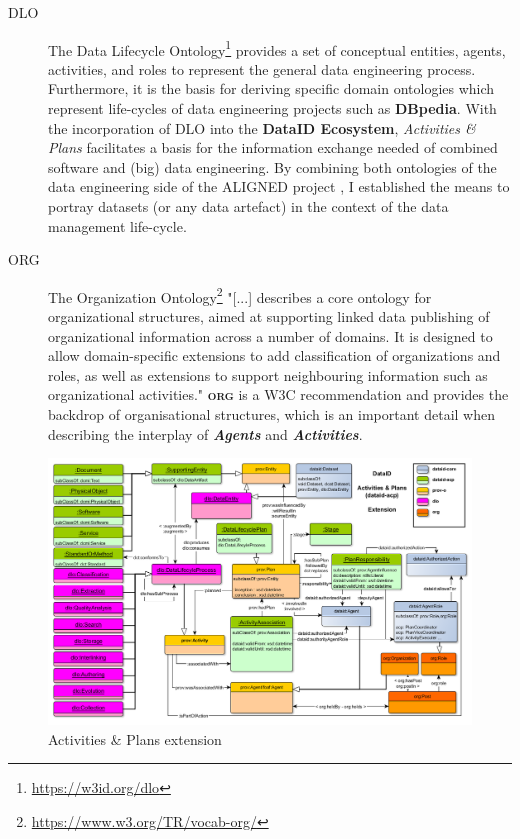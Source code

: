 \documentclass[a4paper,english,twoside,BCOR1.5cm,headsepline,DIV12,appendixprefix,final,12pt]{scrbook}
\newcommand{\ecosystem}{{\ttfamily\bfseries DataID Ecosystem}\xspace}
\newcommand{\org}{{\scshape\bfseries org}\xspace}
\newcommand{\dbpedia}{{\ttfamily\bfseries DBpedia}\xspace}
\newcommand{\important}[1]{\textbf{\textit{#1}}}
\newcommand\footnoteurl[1]{\footnote{\scriptsize\url{#1}}}
\begin{document}
\begin{description}
\item[DLO] The Data Lifecycle Ontology\footnoteurl{https://w3id.org/dlo} provides a set of conceptual entities, agents, activities, and roles to represent the general data engineering process. Furthermore, it is the basis
for deriving specific domain ontologies which represent life-cycles of
data engineering projects such as \dbpedia. With the incorporation of DLO into the \ecosystem, \textit{Activities \& Plans} facilitates a basis for the information exchange needed of combined software and (big) data engineering. By combining both ontologies of the data engineering side of the ALIGNED project \cite{SolankiBFKDB16}, I established the means to portray datasets (or any data artefact) in the context of the data management life-cycle. 
\item[ORG] The Organization Ontology\footnoteurl{https://www.w3.org/TR/vocab-org/} "[...] describes a core ontology for organizational structures, aimed at supporting linked data publishing of organizational information across a number of domains. It is designed to allow domain-specific extensions to add classification of organizations and roles, as well as extensions to support neighbouring information such as organizational activities." \cite{ReynoldsOrg} \org is a W3C recommendation and provides the backdrop of organisational structures, which is an important detail when describing the interplay of \important{Agents} and \important{Activities}.
\end{description}
\begin{figure}
\vspace*{-1.5cm}
\centering
\includegraphics[angle=90, width=\textwidth]{images/ActivityPlansExt.png}
  \caption{Activities \& Plans extension}
  \label{fig:dlo}
\end{figure}
\end{document}
